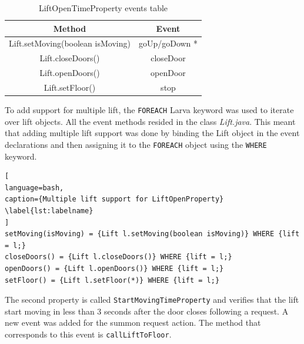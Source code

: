 \documentclass[a4paper, 12pt]{article}
\begin{document}
\begin{table}[htbp]
   \centering
   \begin{tabular}{@{}  |c|c| @{}} %
      \toprule
      Method    & Event \\
      \midrule
      Lift.setMoving(boolean isMoving)   &  goUp/goDown *\\
      Lift.closeDoors()       & closeDoor  \\
      Lift.openDoors()       & openDoor  \\
      Lift.setFloor() & stop    \\
      \bottomrule
   \end{tabular}
   \caption{LiftOpenTimeProperty events table}
   \label{tab:lift-open-time-property}
\end{table}

To add support for multiple lift, the \texttt{FOREACH} Larva keyword was used to iterate over lift objects. All the event methods resided in the class \textit{Lift.java}. This meant that adding multiple lift support was done by binding the Lift object in the event declarations and then assigning it to the \texttt{FOREACH} object using the \texttt{WHERE} keyword.


\begin{lstlisting}[
language=bash, 
caption={Multiple lift support for LiftOpenProperty}
\label{lst:labelname}
]
setMoving(isMoving) = {Lift l.setMoving(boolean isMoving)} WHERE {lift = l;} 
closeDoors() = {Lift l.closeDoors()} WHERE {lift = l;}
openDoors() = {Lift l.openDoors()} WHERE {lift = l;}
setFloor() = {Lift l.setFloor(*)} WHERE {lift = l;}
\end{lstlisting}

The second property is called \texttt{StartMovingTimeProperty} and verifies that the lift start moving in less than 3 seconds after the door closes following a request. A new event was added for the summon request action. The method that corresponds to this event is \texttt{callLiftToFloor}. \\
\end{document}
